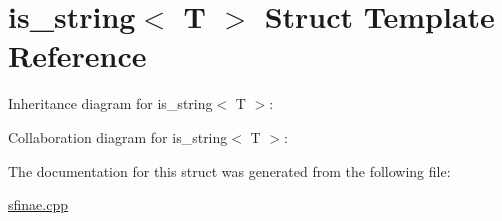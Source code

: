 \hypertarget{structis__string}{}\section{is\+\_\+string$<$ T $>$ Struct Template Reference}
\label{structis__string}


Inheritance diagram for is\+\_\+string$<$ T $>$\+:


Collaboration diagram for is\+\_\+string$<$ T $>$\+:


The documentation for this struct was generated from the following file\+:\begin{DoxyCompactItemize}
\item 
\hyperlink{sfinae_8cpp}{sfinae.\+cpp}\end{DoxyCompactItemize}
